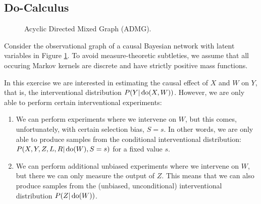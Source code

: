\subsection{Do-Calculus}

\begin{figure}[ht]
\centering
{}
\caption{Acyclic Directed Mixed Graph (ADMG).}
\label{fig:cadmg-1}
\end{figure}

\noindent Consider the observational graph of a causal Bayesian network with latent variables in Figure \ref{fig:cadmg-1}.
To avoid measure-theoretic subtleties, we assume that all occuring Markov kernels are discrete and have strictly positive mass functions.

In this exercise we are interested in estimating the causal effect of $X$ and $W$ on $Y$, that is, the interventional distribution $P(Y|\operatorname{do}(X,W))$. However, we are only able to perform certain interventional experiments:
\begin{enumerate}[label=(\arabic*)]
    \item We can perform experiments where we intervene on $W$, but this comes, unfortunately, with certain selection bias, $S=s$. In other words, we are only able to produce samples from the conditional interventional distribution: $P(X,Y,Z,L,R|\operatorname{do}(W),S=s)$ for a fixed value $s$.
    \item We can perform additional unbiased experiments where we intervene on $W$, but there we can only measure the output of $Z$. This means that we can also produce samples from the (unbiased, unconditional)  interventional distribution $P(Z|\operatorname{do}(W))$.
\end{enumerate}

